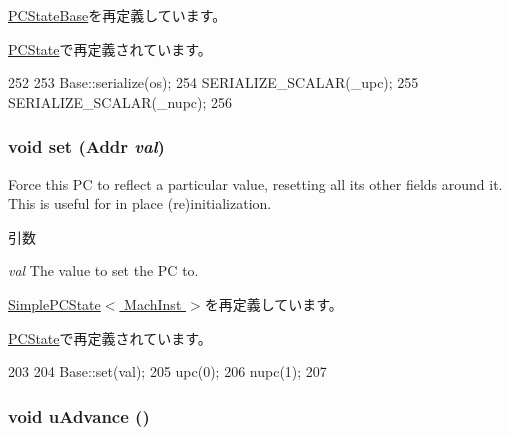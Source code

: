 \hyperlink{classGenericISA_1_1PCStateBase_a53e036786d17361be4c7320d39c99b84}{PCStateBase}を再定義しています。

\hyperlink{classX86ISA_1_1PCState_a53e036786d17361be4c7320d39c99b84}{PCState}で再定義されています。


\begin{DoxyCode}
252     {
253         Base::serialize(os);
254         SERIALIZE_SCALAR(_upc);
255         SERIALIZE_SCALAR(_nupc);
256     }
\end{DoxyCode}
\hypertarget{classGenericISA_1_1UPCState_a9a5b900e841dd75dc81970850547918f}{
\subsubsection[{set}]{\setlength{\rightskip}{0pt plus 5cm}void set ({\bf Addr} {\em val})}}
\label{classGenericISA_1_1UPCState_a9a5b900e841dd75dc81970850547918f}
Force this PC to reflect a particular value, resetting all its other fields around it. This is useful for in place (re)initialization.


\begin{DoxyParams}{引数}
\item[{\em val}]The value to set the PC to. \end{DoxyParams}


\hyperlink{classGenericISA_1_1SimplePCState_a9a5b900e841dd75dc81970850547918f}{SimplePCState$<$ MachInst $>$}を再定義しています。

\hyperlink{classX86ISA_1_1PCState_a9a5b900e841dd75dc81970850547918f}{PCState}で再定義されています。


\begin{DoxyCode}
203     {
204         Base::set(val);
205         upc(0);
206         nupc(1);
207     }
\end{DoxyCode}
\hypertarget{classGenericISA_1_1UPCState_a5e17a0358d00a918a1b1b9beeed380d1}{
\subsubsection[{uAdvance}]{\setlength{\rightskip}{0pt plus 5cm}void uAdvance ()}}
\label{classGenericISA_1_1UPCState_a5e17a0358d00a918a1b1b9beeed380d1}



